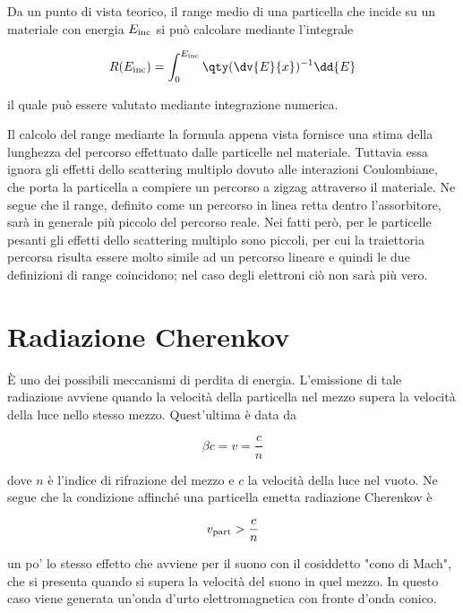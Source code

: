 Da un punto di vista teorico, il range medio di una particella che incide su un materiale con energia $E_{\rm inc}$ si può calcolare mediante l'integrale

\begin{equation*}
    R(E_{\rm inc})=\int_{0}^{E_{\rm inc}} \qty( \dv{E}{x} )^{-1} \dd{E}
\end{equation*}

il quale può essere valutato mediante integrazione numerica.

\begin{approfondimento}
    \footnotesize
    Il calcolo del range mediante la formula appena vista fornisce una stima della lunghezza del percorso effettuato dalle particelle nel materiale. Tuttavia essa ignora gli effetti dello scattering multiplo dovuto alle interazioni Coulombiane, che porta la particella a compiere un percorso a zigzag attraverso il materiale. Ne segue che il range, definito come un percorso in linea retta dentro l'assorbitore, sarà in generale più piccolo del percorso reale. Nei fatti però, per le particelle pesanti gli effetti dello scattering multiplo sono piccoli, per cui la traiettoria percorsa risulta essere molto simile ad un percorso lineare e quindi le due definizioni di range coincidono; nel caso degli elettroni ciò non sarà più vero.
\end{approfondimento}

\section{Radiazione Cherenkov}

È uno dei possibili meccanismi di perdita di energia. L'emissione di tale radiazione avviene quando la velocità della particella nel mezzo supera la velocità della luce nello stesso mezzo. Quest'ultima è data da

\begin{equation*}
    \beta c=v=\frac{c}{n}
\end{equation*}

dove $n$ è l'indice di rifrazione del mezzo e $c$ la velocità della luce nel vuoto. Ne segue che la condizione affinché una particella emetta radiazione Cherenkov è

\begin{equation*}
    v_{\rm part} > \frac{c}{n}
\end{equation*}

\E un po' lo stesso effetto che avviene per il suono con il cosiddetto "cono di Mach", che si presenta quando si supera la velocità del suono in quel mezzo. In questo caso viene generata un'onda d'urto elettromagnetica con fronte d'onda conico.

